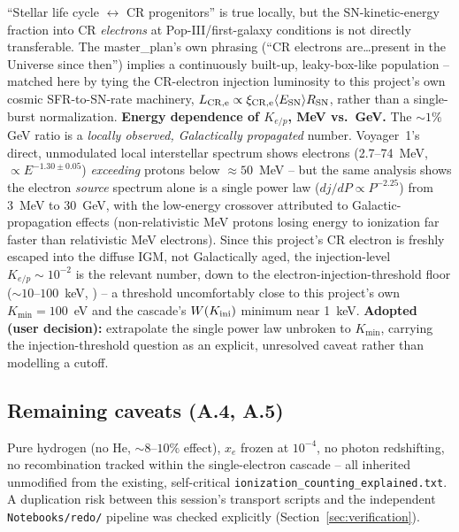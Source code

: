 \documentclass[11pt,a4paper]{article}
\newcommand{\Kini}{K_{\rm ini}}
\begin{document}
``Stellar life cycle $\leftrightarrow$ CR progenitors'' is true locally, but the SN-kinetic-energy
fraction into CR \emph{electrons} at Pop-III/first-galaxy conditions is not directly
transferable. The master\_plan's own phrasing (``CR electrons are\ldots present in the
Universe since then'') implies a continuously built-up, leaky-box-like population -- matched
here by tying the CR-electron injection luminosity to this project's own cosmic
SFR-to-SN-rate machinery, $L_{\rm CR,e}\propto\xi_{\rm CR,e}\langle E_{\rm SN}\rangle R_{\rm SN}$,
rather than a single-burst normalization.
\textbf{Energy dependence of $K_{e/p}$, MeV vs.\ GeV.} The $\sim1\%$ GeV ratio is a
\emph{locally observed, Galactically propagated} number. Voyager~1's direct, unmodulated local
interstellar spectrum \citep{Cummings2016Voyager} shows electrons (2.7--74~MeV,
$\propto E^{-1.30\pm0.05}$) \emph{exceeding} protons below $\approx50$~MeV -- but the same
analysis shows the electron \emph{source} spectrum alone is a single power law
($dj/dP\propto P^{-2.25}$) from 3~MeV to 30~GeV, with the low-energy crossover attributed to
Galactic-propagation effects (non-relativistic MeV protons losing energy to ionization far
faster than relativistic MeV electrons). Since this project's CR electron is freshly escaped
into the diffuse IGM, not Galactically aged, the injection-level $K_{e/p}\sim10^{-2}$ is the
relevant number, down to the electron-injection-threshold floor
($\sim10$--$100$~keV, \citealt{ElectronInjectionThreshold2025}) -- a threshold uncomfortably
close to this project's own $K_{\min}=100$~eV and the cascade's $W(\Kini)$ minimum near 1~keV.
\textbf{Adopted (user decision):} extrapolate the single power law unbroken to $K_{\min}$,
carrying the injection-threshold question as an explicit, unresolved caveat rather than
modelling a cutoff.

\subsection{Remaining caveats (A.4, A.5)}
Pure hydrogen (no He, $\sim8$--$10\%$ effect), $x_e$ frozen at $10^{-4}$, no photon
redshifting, no recombination tracked within the single-electron cascade -- all inherited
unmodified from the existing, self-critical \texttt{ionization\_counting\_explained.txt}.
A duplication risk between this session's transport scripts and the independent
\texttt{Notebooks/redo/} pipeline was checked explicitly (Section~\ref{sec:verification}).
\end{document}
